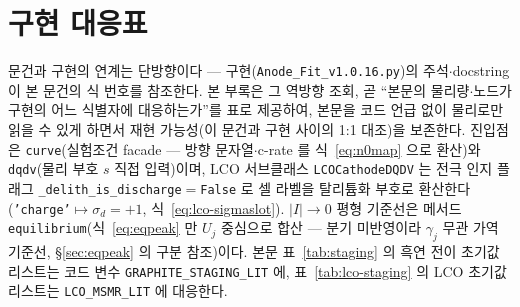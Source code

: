 \documentclass[11pt,a4paper]{article}
\newcommand{\code}[1]{\texttt{#1}}
\begin{document}
\section{구현 대응표}\label{sec:appendix-code}
문건과 구현의 연계는 단방향이다 --- 구현(\code{Anode\_Fit\_v1.0.16.py})의 주석$\cdot$docstring 이 본 문건의
식 번호를 참조한다. 본 부록은 그 역방향 조회, 곧 ``본문의 물리량$\cdot$노드가 구현의 어느 식별자에
대응하는가''를 표로 제공하여, 본문을 코드 언급 없이 물리로만 읽을 수 있게 하면서 재현 가능성(이 문건과
구현 사이의 1:1 대조)을 보존한다. 진입점은 \code{curve}(실험조건 facade — 방향 문자열$\cdot$c-rate 를
식~\eqref{eq:n0map} 으로 환산)와 \code{dqdv}(물리 부호 $s$ 직접 입력)이며, LCO 서브클래스
\code{LCOCathodeDQDV} 는 전극 인지 플래그 \code{\_delith\_is\_discharge}$=$\code{False} 로 셀 라벨을
탈리튬화 부호로 환산한다(\code{'charge'}$\mapsto\sigma_d{=}+1$, 식~\eqref{eq:lco-sigmaslot}). $|I|\to0$
평형 기준선은 메서드 \code{equilibrium}(식~\eqref{eq:eqpeak} 만 $U_j$ 중심으로 합산 — 분기
미반영이라 $\gamma_j$ 무관 가역 기준선, \S\ref{sec:eqpeak} 의 구분 참조)이다. 본문 표~\ref{tab:staging} 의
흑연 전이 초기값 리스트는 코드 변수 \code{GRAPHITE\_STAGING\_LIT} 에, 표~\ref{tab:lco-staging} 의 LCO
초기값 리스트는 \code{LCO\_MSMR\_LIT} 에 대응한다.
\end{document}
